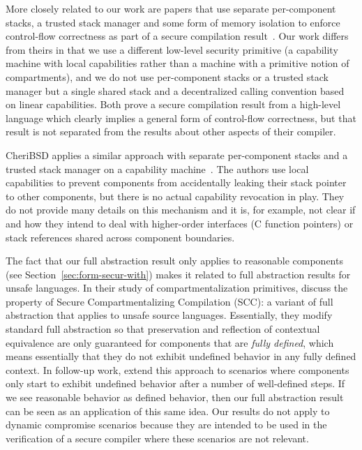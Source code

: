 \documentclass[acmsmall,review,showframe]{acmart}\settopmatter{printfolios=true,printccs=false,printacmref=false}
\begin{document}
More closely related to our work are papers that use separate per-component stacks, a trusted stack manager and some form of memory isolation to enforce control-flow correctness as part of a secure compilation result~\citep{patrignani_modular_2016,juglaret_beyond_2016}.
Our work differs from theirs in that we use a different low-level security primitive (a capability machine with local capabilities rather than a machine with a primitive notion of compartments), and we do not use per-component stacks or a trusted stack manager but a single shared stack and a decentralized calling convention based on linear capabilities.
Both prove a secure compilation result from a high-level language which clearly implies a general form of control-flow correctness, but that result is not separated from the results about other aspects of their compiler.

CheriBSD applies a similar approach with separate per-component stacks and a trusted stack manager on a capability machine~\cite{watson_cheri:_2015}.
The authors use local capabilities to prevent components from accidentally leaking their stack pointer to other components, but there is no actual capability revocation in play.
They do not provide many details on this mechanism and it is, for example, not clear if and how they intend to deal with higher-order interfaces (C function pointers) or stack references shared across component boundaries. 

The fact that our full abstraction result only applies to reasonable components (see Section~\ref{sec:form-secur-with}) makes it related to full abstraction results for unsafe languages.
In their study of compartmentalization primitives,  discuss the property of Secure Compartmentalizing Compilation (SCC): a variant of full abstraction that applies to unsafe source languages.
Essentially, they modify standard full abstraction so that preservation and reflection of contextual equivalence are only guaranteed for components that are {\itshape fully defined}, which means essentially that they do not exhibit undefined behavior in any fully defined context.
In follow-up work, \citet{abate_good_components_2018} extend this approach to scenarios where components only start to exhibit undefined behavior after a number of well-defined steps. 
If we see reasonable behavior as defined behavior, then our full abstraction result can be seen as an application of this same idea.
Our results do not apply to dynamic compromise scenarios because they are intended to be used in the verification of a secure compiler where these scenarios are not relevant.





\end{document}
